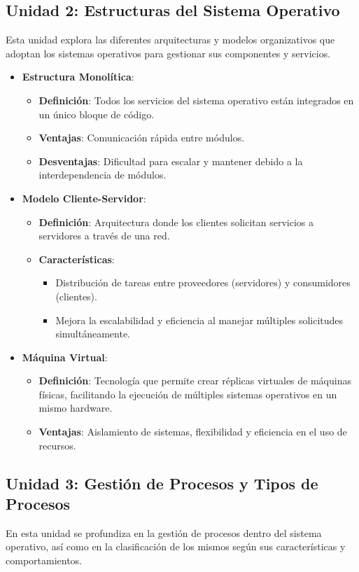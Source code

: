 \subsection{Unidad 2: Estructuras del Sistema Operativo}
Esta unidad explora las diferentes arquitecturas y modelos organizativos que adoptan los sistemas operativos para gestionar sus componentes y servicios.

\begin{itemize}
	\item \textbf{Estructura Monolítica}:
	\begin{itemize}
		\item \textbf{Definición}: Todos los servicios del sistema operativo están integrados en un único bloque de código.
		\item \textbf{Ventajas}: Comunicación rápida entre módulos.
		\item \textbf{Desventajas}: Dificultad para escalar y mantener debido a la interdependencia de módulos.
	\end{itemize}
	
	\item \textbf{Modelo Cliente-Servidor}:
	\begin{itemize}
		\item \textbf{Definición}: Arquitectura donde los clientes solicitan servicios a servidores a través de una red.
		\item \textbf{Características}:
		\begin{itemize}
			\item Distribución de tareas entre proveedores (servidores) y consumidores (clientes).
			\item Mejora la escalabilidad y eficiencia al manejar múltiples solicitudes simultáneamente.
		\end{itemize}
	\end{itemize}
	
	\item \textbf{Máquina Virtual}:
	\begin{itemize}
		\item \textbf{Definición}: Tecnología que permite crear réplicas virtuales de máquinas físicas, facilitando la ejecución de múltiples sistemas operativos en un mismo hardware.
		\item \textbf{Ventajas}: Aislamiento de sistemas, flexibilidad y eficiencia en el uso de recursos.
	\end{itemize}
\end{itemize}

\subsection{Unidad 3: Gestión de Procesos y Tipos de Procesos}
En esta unidad se profundiza en la gestión de procesos dentro del sistema operativo, así como en la clasificación de los mismos según sus características y comportamientos.

